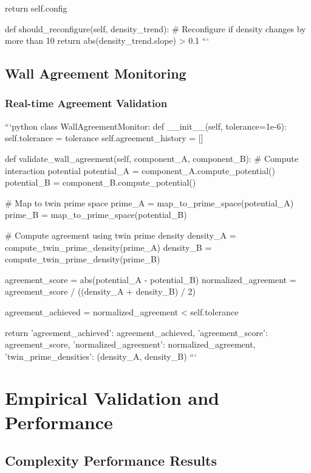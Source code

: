\documentclass[12pt,a4paper]{article}
\begin{document}
        return self.config
    
    def should_reconfigure(self, density_trend):
        # Reconfigure if density changes by more than 10%
        return abs(density_trend.slope) > 0.1
```

\subsection{Wall Agreement Monitoring}

\subsubsection{Real-time Agreement Validation}

```python
class WallAgreementMonitor:
    def __init__(self, tolerance=1e-6):
        self.tolerance = tolerance
        self.agreement_history = []
        
    def validate_wall_agreement(self, component_A, component_B):
        # Compute interaction potential
        potential_A = component_A.compute_potential()
        potential_B = component_B.compute_potential()
        
        # Map to twin prime space
        prime_A = map_to_prime_space(potential_A)
        prime_B = map_to_prime_space(potential_B)
        
        # Compute agreement using twin prime density
        density_A = compute_twin_prime_density(prime_A)
        density_B = compute_twin_prime_density(prime_B)
        
        agreement_score = abs(potential_A - potential_B)
        normalized_agreement = agreement_score / ((density_A + density_B) / 2)
        
        agreement_achieved = normalized_agreement < self.tolerance
        
        return {
            'agreement_achieved': agreement_achieved,
            'agreement_score': agreement_score,
            'normalized_agreement': normalized_agreement,
            'twin_prime_densities': (density_A, density_B)
        }
```

\section{Empirical Validation and Performance}

\subsection{Complexity Performance Results}
\end{document}

